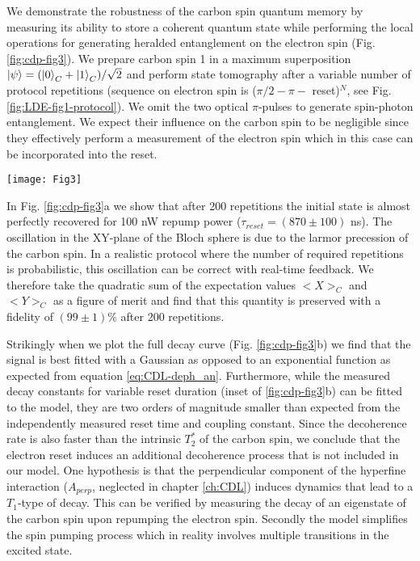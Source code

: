  We demonstrate the robustness of the carbon spin quantum memory by measuring its ability to store a coherent quantum state while performing the local operations for generating heralded entanglement on the electron spin (Fig. \ref{fig:cdp-fig3}). We prepare carbon spin 1 in a maximum superposition $\left|\psi\right>=(\left|0\right>_C + \left|1\right>_C)/\sqrt{2}$ and perform state tomography after a variable number of protocol repetitions (sequence on electron spin is ($\pi/2 - \pi -$ reset)$^N$, see Fig. \ref{fig:LDE-fig1-protocol}). We omit the two optical $\pi$-pulses to generate spin-photon entanglement. We expect their influence on the carbon spin to be negligible since they effectively perform a measurement of the electron spin which in this case can be incorporated into the reset.
 \begin{figure*}
	\centering
	\texttt{[image: Fig3]}
	\caption{\label{fig:cdp-fig3} \textbf{} (a) Tomography of carbon spin 1 initially prepared in a superposition as a function of number of repetitions of the heralded entanglement protocol. The repumping pulse is applied for 20 $\mu$s with a power of 100 nW, the time before and after the microwave $pi$-pulse is 200 ns. (b) Dephasing of the carbon spin for different repumping powers, with the same repump time and interpulse delay as in (a). Inset: the decay constants obtained from a fit to the data in (b) as a function of $\tau_{reset}$ for that laser power. }
\end{figure*}

In Fig. \ref{fig:cdp-fig3}a we show that after 200 repetitions the initial state is almost perfectly recovered for 100 nW repump power ($\tau_{reset} = (870 \pm 100)$ ns). The oscillation in the XY-plane of the Bloch sphere is due to the larmor precession of the carbon spin. In a realistic protocol where the number of required repetitions is probabilistic, this oscillation can be correct with real-time feedback. We therefore take the quadratic sum of the expectation values $<X>_C$ and $<Y>_C$ as a figure of merit and find that this quantity is preserved with a fidelity of $(99 \pm 1) \%$ after 200 repetitions.

Strikingly when we plot the full decay curve (Fig. \ref{fig:cdp-fig3}b) we find that the signal is best fitted with a Gaussian as opposed to an exponential function as expected from equation \ref{eq:CDL-deph_an}. Furthermore, while the measured decay constants for variable reset duration (inset of \ref{fig:cdp-fig3}b) can be fitted to the model, they are two orders of magnitude smaller than expected from the independently measured reset time and coupling constant. Since the decoherence rate is also faster than the intrinsic $T_2^{*}$ of the carbon spin, we conclude that the electron reset induces an additional decoherence process that is not included in our model. One hypothesis is that the perpendicular component of the hyperfine interaction ($A_{perp}$, neglected in chapter \ref{ch:CDL}) induces dynamics that lead to a $T_1$-type of decay. This can be verified by measuring the decay of an eigenstate of the carbon spin upon repumping the electron spin. Secondly the model simplifies the spin pumping process which in reality involves multiple transitions in the excited state. 

